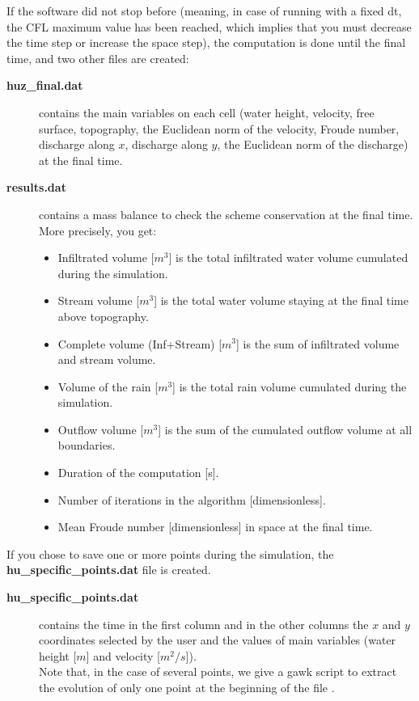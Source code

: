 \documentclass[a4paper, 11pt]{article}
\begin{document}
If the software did not stop before (meaning, in case of running with a fixed dt, the CFL maximum value has been reached, which implies that you must decrease the time step or increase the space step), 
the computation is done until the final time, and two other files are created:
\begin{description}
	\item[\textbf{huz\_final.dat}] contains the main variables on each cell (water height, velocity, free surface, topography, the Euclidean norm of the velocity, Froude number, discharge along $x$, discharge along $y$, the Euclidean norm of the discharge) at the final time.
	\item[\textbf{results.dat}] contains a mass balance to check the scheme conservation at the final time.
	More precisely, you get:
	\begin{itemize}
		\item Infiltrated volume [$m^3$] is the total infiltrated water volume cumulated during the simulation. 
		\item Stream volume [$m^3$] is the total water volume staying at the final time above topography. 
		\item Complete volume (Inf+Stream) [$m^3$] is the sum of infiltrated volume and stream volume.
		\item Volume of the rain [$m^3$] is the total rain volume cumulated during the simulation. 
		\item Outflow volume [$m^3$] is the sum of the cumulated outflow volume at all boundaries. 
		\item Duration of the computation [s]. 
		\item Number of iterations in the algorithm [dimensionless]. 
		\item Mean Froude number [dimensionless] in space at the final time. 
	\end{itemize}
\end{description}

If you chose to save one or more points during the simulation, the \textbf{hu\_specific\_points.dat} file is created.
\begin{description}
\item[\textbf{hu\_specific\_points.dat}] contains the time in the first column and in the other columns the $x$ and $y$ coordinates selected by the user and the values of main variables (water height [$m$] and velocity [$m^2/s$]).\\
  Note that, in the case of several points, we give a gawk script to extract the evolution of only one point at the beginning of the file .
\end{description}
\end{document}
